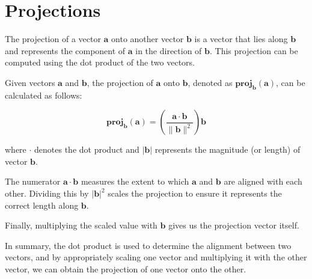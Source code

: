 \chapter{Projections}

The projection of a vector $\mathbf{a}$ onto another vector $\mathbf{b}$ is a vector that lies along $\mathbf{b}$ and represents the component of $\mathbf{a}$ in the direction of $\mathbf{b}$. This projection can be computed using the dot product of the two vectors.

Given vectors $\mathbf{a}$ and $\mathbf{b}$, the projection of $\mathbf{a}$ onto $\mathbf{b}$, denoted as $\mathbf{proj}_\mathbf{b}(\mathbf{a})$, can be calculated as follows:

$$\mathbf{proj}_\mathbf{b}(\mathbf{a}) = \left(\frac{{\mathbf{a} \cdot \mathbf{b}}}{{\|\mathbf{b}\|^2}}\right) \mathbf{b}$$

where $\cdot$ denotes the dot product and $|\mathbf{b}|$ represents the magnitude (or length) of vector $\mathbf{b}$.

The numerator $\mathbf{a} \cdot \mathbf{b}$ measures the extent to which $\mathbf{a}$ and $\mathbf{b}$ are aligned with each other. Dividing this by $|\mathbf{b}|^2$ scales the projection to ensure it represents the correct length along $\mathbf{b}$.

Finally, multiplying the scaled value with $\mathbf{b}$ gives us the projection vector itself.

In summary, the dot product is used to determine the alignment between two vectors, and by appropriately scaling one vector and multiplying it with the other vector, we can obtain the projection of one vector onto the other.